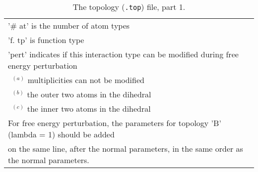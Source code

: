 \begin{table}[p]
{\begin{tabular}{|l|lllll|}
\multicolumn{6}{l}{'\# at' is the number of atom types} \\
\multicolumn{6}{l}{'f. tp' is function type} \\
\multicolumn{6}{l}{'pert' indicates if this interaction type
can be modified during free energy perturbation} \\
\multicolumn{6}{l}{~$^{(a)}$ multiplicities can not be modified} \\
\multicolumn{6}{l}{~$^{(b)}$ the outer two atoms in the dihedral} \\
\multicolumn{6}{l}{~$^{(c)}$ the inner two atoms in the dihedral} \\
\multicolumn{6}{l}{For free energy perturbation, the parameters for topology 'B' (lambda = 1) should be added} \\
\multicolumn{6}{l}{on the same line, after the normal parameters,
in the same order as the normal parameters.} \\
\end{tabular}
}
\caption{The topology ({\tt *.top}) file, part 1.}
\label{ta:topfile1}
\end{table}
\cleardoublepage
